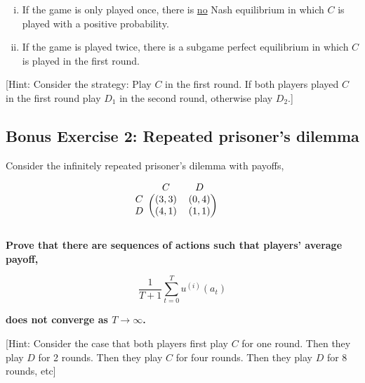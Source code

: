 \documentclass[10pt]{article}
\begin{document}
\begin{enumerate}[(i)]
    \item If the game is only played once, there is \underline{no} Nash equilibrium
    in which \(C\) is played with a positive probability.
    \item If the game is played twice, there is a subgame perfect equilibrium
    in which \(C\) is played in the first round.
\end{enumerate}


[Hint: Consider the strategy: Play \(C\) in the first round. If both players
played \(C\) in the first round play \(D_1\) in the second round, otherwise play
\(D_2\).]

\subsection*{Bonus Exercise 2: Repeated prisoner's dilemma}

Consider the infinitely repeated prisoner's dilemma with payoffs,

\begin{equation*}
    \begin{blockarray}{ccc}
        & C & D \\
        \begin{block}{c(cc)}
            C & (3, 3) & (0, 4) \\
            D & (4, 1) & (1, 1) \\
        \end{block}
    \end{blockarray}\qquad
\end{equation*}


\textbf{Prove that there are sequences of actions such that players' average payoff,}

\[\frac{1}{T+1} \sum\limits_{t=0}^{T} u^{(i)}(a_t)\]

\textbf{does not converge as \(T \rightarrow \infty\).}

[Hint: Consider the case that both players first play \(C\) for one round. Then they
play \(D\) for 2 rounds. Then they play \(C\) for four rounds. Then they play
\(D\) for 8 rounds, etc]
\end{document}
